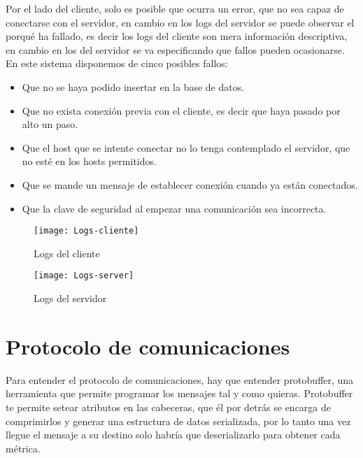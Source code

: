 \documentclass[ spanish, a4paper, 12pt, oneside]{report}
\begin{document}
Por el lado del cliente, solo es posible que ocurra un error, que no sea capaz de conectarse con el servidor, en cambio en los logs del servidor se puede observar el porqué ha fallado, es decir los logs del cliente son mera información descriptiva, en cambio en los del servidor 
se va especificando que fallos pueden ocasionarse. En este sistema disponemos de cinco posibles fallos: \\


\begin{itemize}
   \item Que no se haya podido insertar en la base de datos.
   \item Que no exista conexión previa con el cliente, es decir que haya pasado por alto un paso.
   \item Que el host que se intente conectar no lo tenga contemplado el servidor, que no esté en los hosts permitidos.
   \item Que se mande un mensaje de establecer conexión cuando ya están conectados.
   \item Que la clave de seguridad al empezar una comunicación sea incorrecta.
\end{itemize}

\begin{figure}[!h]
   \centering
   \texttt{[image: Logs-cliente]}\\
      \caption{\label{fig: Logs del cliente} Logs del cliente}
\end{figure}

\begin{figure}[!h]
   \centering
   \texttt{[image: Logs-server]}\\
      \caption{\label{fig: Logs del servidor} Logs del servidor}
\end{figure}

\section{Protocolo de comunicaciones}

Para entender el protocolo de comunicaciones, hay que entender protobuffer, una herramienta que permite programar los mensajes tal y como quieras. Protobuffer te permite setear atributos en las cabeceras, que él por detrás se encarga de 
comprimirlos y generar una estructura de datos serializada, por lo tanto una vez llegue el mensaje a su destino solo habría que deserializarlo para obtener cada métrica. \\
\end{document}
